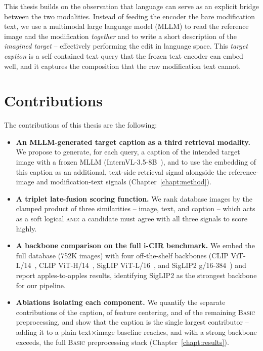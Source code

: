This thesis builds on the observation that language can serve as an explicit
bridge between the two modalities. Instead of feeding the encoder the bare
modification text, we use a multimodal large language model (MLLM) to read the
reference image and the modification \emph{together} and to write a short
description of the \emph{imagined target} -- effectively performing the edit in
language space. This \emph{target caption} is a self-contained text query that
the frozen text encoder can embed well, and it captures the composition that
the raw modification text cannot.

\section{Contributions}\label{sect:intro_contrib}

The contributions of this thesis are the following:

\begin{itemize}
  \item \textbf{An MLLM-generated target caption as a third retrieval modality.}
        We propose to generate, for each query, a caption of the intended
        target image with a frozen MLLM (InternVL-3.5-8B~\cite{wang2025internvl35}), and to use the
        embedding of this caption as an additional, text-side retrieval signal
        alongside the reference-image and modification-text signals
        (Chapter~\ref{chapt:method}).
  \item \textbf{A triplet late-fusion scoring function.} We rank database
        images by the clamped product of three similarities -- image, text,
        and caption -- which acts as a soft logical \textsc{and}: a candidate
        must agree with all three signals to score highly.
  \item \textbf{A backbone comparison on the full i-CIR benchmark.} We embed
        the full database (752K images) with four off-the-shelf backbones
        (CLIP ViT-L/14~\cite{radford2021clip}, CLIP ViT-H/14~\cite{ilharco2021openclip},
        SigLIP ViT-L/16~\cite{zhai2023siglip}, and SigLIP2 g/16-384~\cite{tschannen2025siglip2})
        and report apples-to-apples results, identifying SigLIP2 as the
        strongest backbone for our pipeline.
  \item \textbf{Ablations isolating each component.} We quantify the separate
        contributions of the caption, of feature centering, and of the
        remaining \textsc{Basic} preprocessing, and show that the caption is
        the single largest contributor -- adding it to a plain text$\times$image
        baseline reaches, and with a strong backbone exceeds, the full
        \textsc{Basic} preprocessing stack (Chapter~\ref{chapt:results}).
\end{itemize}

